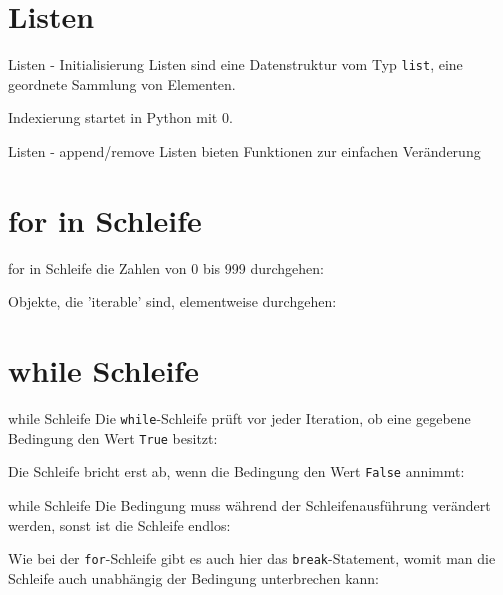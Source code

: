 \section{Listen}
\begin{frame}{Listen - Initialisierung}
	Listen sind eine Datenstruktur vom Typ \alert{\texttt{list}}, eine geordnete Sammlung von Elementen.
	
	Indexierung startet in Python mit 0.
	
\end{frame}
\begin{frame}{Listen - append/remove}
	Listen bieten Funktionen zur einfachen Veränderung
	
	
	
	
\end{frame}

\section{for in Schleife}
\begin{frame}{for in Schleife}
	die Zahlen von 0 bis 999 durchgehen:
	
	Objekte, die 'iterable' sind, elementweise durchgehen:
	
	
\end{frame}

\section{while Schleife}
	\begin{frame}{while Schleife}
		Die \alert{\texttt{while}}-Schleife prüft vor jeder Iteration, ob eine gegebene Bedingung den Wert \alert{\texttt{True}} besitzt:
		
		Die Schleife bricht erst ab, wenn die Bedingung den Wert \alert{\texttt{False}} annimmt:
		
	\end{frame}
	
	\begin{frame}{while Schleife}
	Die Bedingung muss während der Schleifenausführung verändert werden, sonst ist die Schleife endlos:
	
	Wie bei der \alert{\texttt{for}}-Schleife gibt es auch hier das \alert{\texttt{break}}-Statement, womit man die Schleife auch unabhängig der Bedingung unterbrechen kann:
	
	\end{frame}

